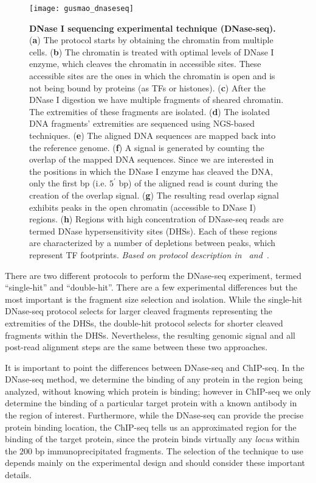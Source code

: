 \begin{figure}[h!]
\centering
\texttt{[image: gusmao\_dnaseseq]}
\caption[DNase I sequencing experimental technique (DNase-seq)]{\textbf{DNase I sequencing experimental technique (DNase-seq).} (\textbf{a}) The protocol starts by obtaining the chromatin from multiple cells. (\textbf{b}) The chromatin is treated with optimal levels of DNase I enzyme, which cleaves the chromatin in accessible sites. These accessible sites are the ones in which the chromatin is open and is not being bound by proteins (as TFs or histones). (\textbf{c}) After the DNase I digestion we have multiple fragments of sheared chromatin. The extremities of these fragments are isolated. (\textbf{d}) The isolated DNA fragments' extremities are sequenced using NGS-based techniques. (\textbf{e}) The aligned DNA sequences are mapped back into the reference genome. (\textbf{f}) A signal is generated by counting the overlap of the mapped DNA sequences. Since we are interested in the positions in which the DNase I enzyme has cleaved the DNA, only the first bp (i.e. $5^{\prime}$ bp) of the aligned read is count during the creation of the overlap signal. (\textbf{g}) The resulting read overlap signal exhibits peaks in the open chromatin (accessible to DNase I) regions. (\textbf{h}) Regions with high concentration of DNase-seq reads are termed DNase hypersensitivity sites (DHSs). Each of these regions are characterized by a number of depletions between peaks, which represent TF footprints. \emph{Based on protocol description in~\cite{crawford2004} and~\cite{sabo2004a}}.}
\label{fig:gusmao_dnaseseq}
\end{figure}

There are two different protocols to perform the DNase-seq experiment, termed ``single-hit'' and ``double-hit''. There are a few experimental differences but the most important is the fragment size selection and isolation. While the single-hit DNase-seq protocol selects for larger cleaved fragments representing the extremities of the DHSs, the double-hit protocol selects for shorter cleaved fragments within the DHSs. Nevertheless, the resulting genomic signal and all post-read alignment steps are the same between these two approaches.

It is important to point the differences between DNase-seq and ChIP-seq. In the DNase-seq method, we determine the binding of any protein in the region being analyzed, without knowing which protein is binding; however in ChIP-seq we only determine the binding of a particular target protein with a known antibody in the region of interest. Furthermore, while the DNase-seq can provide the precise protein binding location, the ChIP-seq tells us an approximated region for the binding of the target protein, since the protein binds virtually any \emph{locus} within the \approxy$200$ bp immunoprecipitated fragments. The selection of the technique to use depends mainly on the experimental design and should consider these important details.

